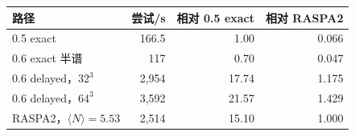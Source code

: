 \begin{center}\small\begin{tabular}{@{}lrrr@{}}\toprule
路径 & 尝试/s & 相对 0.5 exact & 相对 RASPA2\\\midrule
0.5 exact & 166.5 & 1.00 & 0.066\\
0.6 exact 半谱 & 117 & 0.70 & 0.047\\
0.6 delayed，$32^3$ & 2,954 & 17.74 & 1.175\\
0.6 delayed，$64^3$ & 3,592 & 21.57 & 1.429\\
RASPA2，$\langle N\rangle=5.53$ & 2,514 & 15.10 & 1.000\\
\bottomrule\end{tabular}\end{center}
